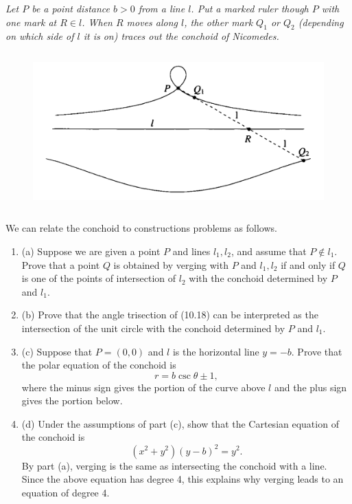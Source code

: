 \documentclass[11pt,a4paper]{article}
\newcommand{\be} {\begin{enumerate}}
\newcommand{\ee} {\end{enumerate}}
\begin{document}
{\it Let $P$ be a point distance $b>0$ from a line $l$. Put a marked ruler though $P$ with one mark at $R \in l$. When $R$ moves along $l$, the other mark $Q_1$ or $Q_2$ (depending on which side of $l$ it is on) traces out the conchoid of Nicomedes.

\begin{figure}[htbp]
\begin{center}
\includegraphics [width=12cm,height=6cm] {Ex_10_3_16.png}
\end{center}
\end{figure}

We can relate the conchoid to constructions problems as follows.
\be
\item[(a)] Suppose we are given a point $P$ and lines $l_1,l_2$, and assume that $P \not \in l_1$. Prove that a point $Q$ is obtained by verging with $P$ and $l_1,l_2$ if and only if $Q$ is one of the points of intersection of $l_2$ with the conchoid determined by $P$ and $l_1$.
\item[(b)] Prove that the angle trisection of (10.18) can be interpreted as the intersection of the unit circle with the conchoid determined by $P$ and $l_1$.

\item[(c)] Suppose that $P = (0,0)$ and $l$ is the horizontal line $y=-b$. Prove that the polar equation of the conchoid is
$$r = b \csc \theta \pm 1,$$
where the minus sign gives the portion of the curve above $l$ and the plus sign gives the portion below.
\item[(d)] Under the assumptions of part (c), show that the Cartesian equation of the conchoid is
$$(x^2+y^2)(y-b)^2 = y^2.$$
By part (a), verging is the same as intersecting the conchoid with a line. Since the above equation has degree 4, this explains why verging leads to an equation of degree 4.
\ee
}
\end{document}
